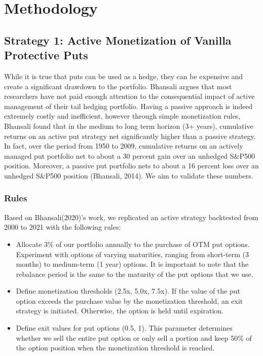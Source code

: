 \documentclass[12pt]{article}
\begin{document}
{{\section{Methodology}

\subsection{Strategy 1: Active Monetization of Vanilla Protective Puts}

\qquad While it is true that puts can be used as a hedge, they can be expensive and create a significant drawdown to the portfolio. Bhansali argues that most researchers have not paid enough attention to the consequential impact of active management of their tail hedging portfolio. Having a passive approach is indeed extremely costly and inefficient, however through simple monetization rules, Bhansali found that in the medium to long term horizon (3+ years), cumulative returns on an active put strategy net significantly higher than a passive strategy. In fact, over the period from 1950 to 2009, cumulative returns on an actively managed put portfolio net to about a 30 percent gain over an unhedged S\&P500 position. Moreover, a passive put portfolio nets to about a 16 percent loss over an unhedged S\&P500 position (Bhansali, 2014). We aim to validate these numbers. 

\subsubsection{Rules}
Based on Bhansali(2020)'s work, we replicated an active strategy backtested from 2000 to 2021 with the following rules:

\begin{itemize}
  \item Allocate 3\% of our portfolio annually to the purchase of OTM put options. Experiment with options of varying maturities, ranging from short-term (3 months) to medium-term (1 year) options. It is important to note that the rebalance period is the same to the maturity of the put options that we use.
  \item Define monetization thresholds (2.5x, 5.0x, 7.5x). If the value of the put option exceeds the purchase value by the monetization threshold, an exit strategy is initiated. Otherwise, the option is held until expiration.
  \item Define exit values for put options (0.5, 1). This parameter determines whether we sell the entire put option or only sell a portion and keep 50\% of the option position when the monetization threshold is reached.
\end{itemize}

}}
\end{document}
